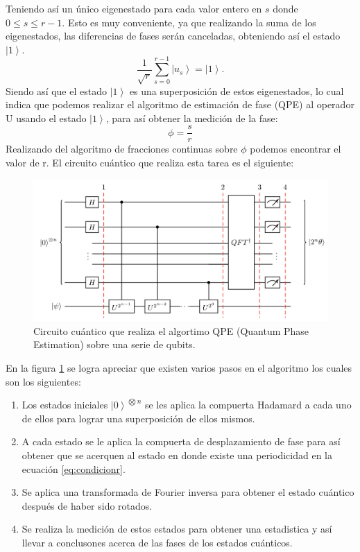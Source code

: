 Teniendo así un único eigenestado para cada valor entero en $s$ donde $0\leq s \leq r-1$. Esto es muy conveniente, ya que realizando la suma de los eigenestados, las diferencias de fases
serán canceladas, obteniendo así el estado $ \left| 1 \right\rangle$.
\begin{equation*}
    \frac{1}{\sqrt{r}} \sum\limits_{s=0}^{r-1} \left|u_s \right\rangle =  \left| 1 \right\rangle.
\end{equation*}
Siendo así que el estado $ \left| 1 \right\rangle$ es una superposición de estos eigenestados, lo cual indica que podemos realizar 
el algoritmo de estimación de fase (QPE) \cite{Yimsiriwattana2004,Gerjuoy2005} al operador U usando el estado $ \left| 1 \right\rangle$, para así obtener la medición de la fase:
\begin{equation*}
    \phi = \frac{s}{r}
\end{equation*}
Realizando del algoritmo de fracciones continuas sobre $\phi$ podemos encontrar el valor de r. El circuito cuántico que realiza esta tarea es el siguiente:
\begin{figure}[H]
    \includegraphics[scale=0.4]{../Graphics/qpe.png}
    \caption{Circuito cuántico que realiza el algortimo QPE (Quantum Phase Estimation) sobre una serie de qubits.}
    \label{fig:qpe}
\end{figure}
En la figura \ref{fig:qpe} se logra apreciar que existen varios pasos en el algoritmo los cuales son los siguientes:
\begin{enumerate}
    \item Los estados iniciales $\left|0  \right\rangle^{\bigotimes n}$ se les aplica la compuerta Hadamard a cada uno de ellos para lograr una superposición de ellos mismos.
    \item A cada estado se le aplica la compuerta de desplazamiento de fase para así obtener que se acerquen al estado en donde existe una periodicidad en la ecuación \ref{eq:condicionr}.
    \item Se aplica una transformada de Fourier inversa para obtener el estado cuántico después de haber sido rotados.
    \item Se realiza la medición de estos estados para obtener una estadistica y así llevar a conclusones acerca de las fases de los estados cuánticos.
\end{enumerate}